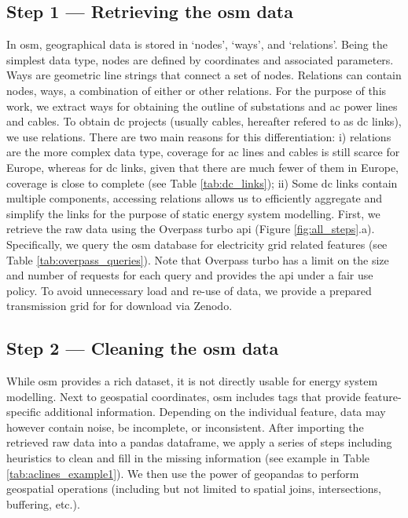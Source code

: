 \documentclass[fleqn,10pt]{wlscirep}
\let\autocite\cite
\begin{document}
\subsection*{Step 1 --- Retrieving the \gls{osm} data}
In \gls{osm}, geographical data is stored in `nodes', `ways', and `relations'. Being the simplest data type, nodes are defined by coordinates and associated parameters. Ways are geometric line strings that connect a set of nodes. Relations can contain nodes, ways, a combination of either or other relations. \autocite{medjroubiOpenDataPower2017} For the purpose of this work, we extract ways for obtaining the outline of substations and \acrshort{ac} power lines and cables. To obtain \acrshort{dc} projects (usually cables, hereafter refered to as \acrshort{dc} links), we use relations. There are two main reasons for this differentiation: i) relations are the more complex data type, coverage for \acrshort{ac} lines and cables is still scarce for Europe, whereas for \acrshort{dc} links, given that there are much fewer of them in Europe, coverage is close to complete (see Table \ref{tab:dc_links}); ii) Some \acrshort{dc} links contain multiple components, accessing relations allows us to efficiently aggregate and simplify the links for the purpose of static energy system modelling.
First, we retrieve the raw data using the Overpass turbo \gls{api}\autocite{raiferOverpassTurbo2024} (Figure \ref{fig:all_steps}.a). Specifically, we query the \gls{osm} database for electricity grid related features (see Table \ref{tab:overpass_queries}). Note that Overpass turbo has a limit on the size and number of requests for each query and provides the \gls{api} under a fair use policy. To avoid unnecessary load and re-use of data, we provide a prepared transmission grid for for download via Zenodo. \autocite{xiongPrebuiltElectricityNetwork2024}

\subsection*{Step 2 --- Cleaning the \gls{osm} data}
While \gls{osm} provides a rich dataset, it is not directly usable for energy system modelling. Next to geospatial coordinates, \gls{osm} includes tags that provide feature-specific additional information. Depending on the individual feature, data may however contain noise, be incomplete, or inconsistent. After importing the retrieved raw data into a pandas dataframe,\autocite{mckinneyDataStructuresStatistical2010} we apply a series of steps including heuristics to clean and fill in the missing information (see example in Table \ref{tab:aclines_example1}). We then use the power of geopandas\autocite{jordahlGeopandasGeopandasV02020} to perform geospatial operations (including but not limited to spatial joins, intersections, buffering, etc.).
\end{document}
